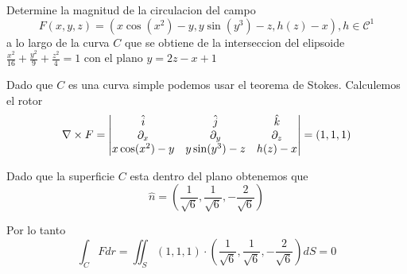 \message{ !name(MAT024.tex)}\documentclass[../main.tex]{subfiles}
\begin{document}
\begin{problem}
  Determine la magnitud de la circulacion del campo
  \begin{equation*}
    F(x, y, z) = (x \cos(x^{2}) - y, y \sin(y^{3}) - z, h(z) - x), h \in \mathcal{C^{1}}
  \end{equation*}
  a lo largo de la curva $C$ que se obtiene de la interseccion del elipsoide $\frac{x^{2}}{16} + \frac{y^{2}}{9} + \frac{z^{2}}{4} = 1$ con el plano $y = 2z - x + 1$
\end{problem}
\begin{solution}
  Dado que $C$ es una curva simple podemos usar el teorema de Stokes. Calculemos el rotor
  \begin{equation*}
    \nabla \times F = \begin{vmatrix} \hat{i} & \hat{j} & \hat{k}\\ \partial_x & \partial_y & \partial_z\\ x \cos(x^{2}) - y & y \sin(y^{3}) - z & h(z) - x\end{vmatrix} = (1, 1, 1)
  \end{equation*}

  Dado que la superficie $C$ esta dentro del plano obtenemos que
  \begin{equation*}
    \hat{n} = (\frac{1}{\sqrt{6}}, \frac{1}{\sqrt{6}}, -\frac{2}{\sqrt{6}})
  \end{equation*}

  Por lo tanto
  \begin{equation*}
    \int_{C} F dr = \iint_{S} (1, 1, 1) \cdot (\frac{1}{\sqrt{6}}, \frac{1}{\sqrt{6}}, -\frac{2}{\sqrt{6}}) dS = 0
  \end{equation*}
\end{solution}
\end{document}
